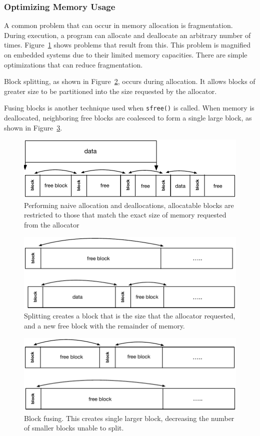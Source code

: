 \subsubsection{Optimizing Memory Usage}

A common problem that can occur in memory allocation is fragmentation. During execution, a program can allocate and deallocate an arbitrary number of times. Figure~\ref{fig:fragmentation} shows problems that result from this. This problem is magnified on embedded systems due to their limited memory capacities. There are simple optimizations that can reduce fragmentation. 

Block splitting, as shown in Figure~\ref{fig:split}, occurs during allocation. It allows blocks of greater size to be partitioned into the size requested by the allocator. 

Fusing blocks is another technique used when \texttt{sfree()} is called. When memory is deallocated, neighboring free blocks are coalesced to form a single large block, as shown in Figure~\ref{fig:fuse}. 

\begin{figure}[!htb]
\centering
\includegraphics[scale=.55]{figs/fragmentation.pdf}
\caption{Performing naive allocation and deallocations, allocatable blocks are restricted to those that match the exact size of memory requested from the allocator}
\label{fig:fragmentation}
\end{figure}

\begin{figure}[!htb]
\centering
\includegraphics[scale=.55]{figs/split.pdf}
\caption{Splitting creates a block that is the size that the allocator requested, and a new free block with the remainder of memory.}
\label{fig:split}
\end{figure}


\begin{figure}[!htb]
\centering
\includegraphics[scale=.55]{figs/fuse.pdf}
\caption{Block fusing. This creates single larger block, decreasing the number of smaller blocks unable to split.}
\label{fig:fuse}
\end{figure}

%
%
